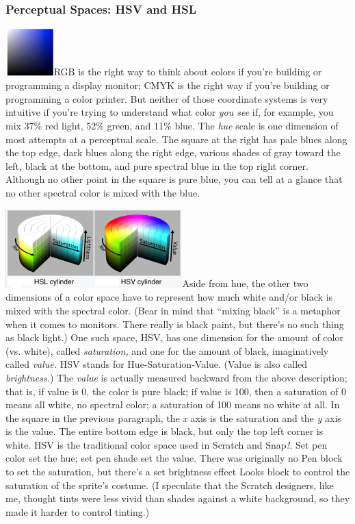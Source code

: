 \subsubsection{Perceptual Spaces: HSV and
HSL}\label{perceptual-spaces-hsv-and-hsl}

\includegraphics[width=0.73611in,height=0.72222in]{media/image1199.png}RGB
is the right way to think about colors if you're building or programming
a display monitor; CMYK is the right way if you're building or
programming a color printer. But neither of those coordinate systems is
very intuitive if you're trying to understand what color \emph{you see}
if, for example, you mix 37\% red light, 52\% green, and 11\% blue. The
\emph{hue} scale is one dimension of most attempts at a perceptual
scale. The square at the right has pale blues along the top edge, dark
blues along the right edge, various shades of gray toward the left,
black at the bottom, and pure spectral blue in the top right corner.
Although no other point in the square is pure blue, you can tell at a
glance that no other spectral color is mixed with the blue.

\includegraphics[width=2.69167in,height=1.19028in]{media/image1200.png}Aside
from hue, the other two dimensions of a color space have to represent
how much white and/or black is mixed with the spectral color. (Bear in
mind that ``mixing black'' is a metaphor when it comes to monitors.
There really is black paint, but there's no such thing as black light.)
One such space, HSV, has one dimension for the amount of color (vs.
white), called \emph{saturation,} and one for the amount of black,
imaginatively called \emph{value.} HSV stands for Hue-Saturation-Value.
(Value is also called \emph{brightness.}) The \emph{value} is actually
measured backward from the above description; that is, if value is 0,
the color is pure black; if value is 100, then a saturation of 0 means
all white, no spectral color; a saturation of 100 means no white at all.
In the square in the previous paragraph, the \emph{x} axis is the
saturation and the \emph{y} axis is the value. The entire bottom edge is
black, but only the top left corner is white. HSV is the traditional
color space used in Scratch and Snap\emph{!.} Set pen color set the hue;
set pen shade set the value. There was originally no Pen block to set
the saturation, but there's a set brightness effect Looks block to
control the saturation of the sprite's costume. (I speculate that the
Scratch designers, like me, thought tints were less vivid than shades
against a white background, so they made it harder to control tinting.)

